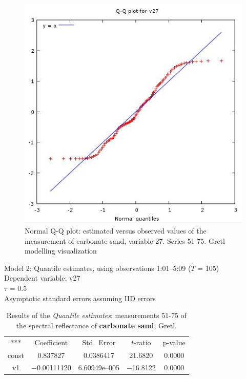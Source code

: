 \documentclass[10pt, a4paper]{article}
\begin{document}
\begin{appendices}
\begin{figure}[H]
\begin{center}
\includegraphics[scale=0.4]{G-QQplot-sand.jpg}
\caption{Normal Q-Q plot: estimated versus observed values of the measurement of carbonate sand, variable 27. Series 51-75. Gretl modelling visualization­}
\label{fig:57}
\end{center}
\end{figure}

\begin{table}[H]
\caption{Results of the \textit{Quantile estimates}: measurements 51-75 of the spectral reflectance of \textbf{carbonate sand}, Gretl.}
\begin{center}
Model 2: Quantile estimates, using observations 1:01--5:09 ($T$ = 105)\\
Dependent variable: v27\\
$\tau$ = 0.5\\
Asymptotic standard errors assuming IID errors\\

\vspace{1em}

\begin{tabular}{c c c c c}
***   & {Coefficient} & {Std.\ Error} & {$t$-ratio} & {p-value} \\[1ex]
const &  0.837827 &    0.0386417 &      21.6820 &         0.0000 \\
v1 &   $-$0.00111120 &     6.60949\textrm{e--005} &       $-$16.8122 &         0.0000 \\ \hline \hline
\end{tabular}


\end{center}
\end{table}
\end{appendices}
\end{document}
